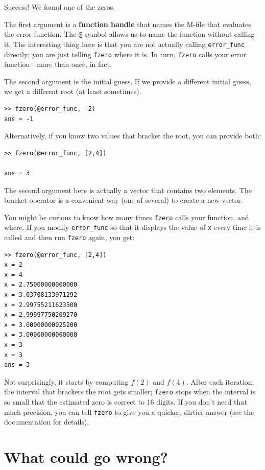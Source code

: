 \documentclass[
]{book}
\begin{document}
Success!  We found one of the zeros.

The first argument is a
{\bf function handle} that names the M-file that evaluates
the error function.  The {\tt @} symbol allows us to name the
function without calling it.  The interesting thing here is
that you are not actually calling {\tt error\_func} directly;
you are just telling {\tt fzero} where it is.  In turn, {\tt fzero}
calls your error function---more than once, in fact.

The second argument is the initial guess.  If we provide a different
initial guess, we get a different root (at least sometimes).

\begin{verbatim}
>> fzero(@error_func, -2)
ans = -1
\end{verbatim}

Alternatively, if you know two values that bracket the root,
you can provide both:

\begin{verbatim}
>> fzero(@error_func, [2,4])

ans = 3
\end{verbatim}

The second argument here is actually a vector that contains two
elements.  The bracket operator is a convenient way (one of several)
to create a new vector.

You might be curious to know how many times {\tt fzero} calls your
function, and where.  If you modify {\tt error\_func} so that it displays
the value of {\tt x} every time it is called and then run {\tt fzero}
again, you get:

\begin{verbatim}
>> fzero(@error_func, [2,4])
x = 2
x = 4
x = 2.75000000000000
x = 3.03708133971292
x = 2.99755211623500
x = 2.99997750209270
x = 3.00000000025200
x = 3.00000000000000
x = 3
x = 3
ans = 3
\end{verbatim}

Not surprisingly, it starts by computing $f(2)$ and $f(4)$.  After
each iteration, the interval that brackets the root gets smaller;
{\tt fzero} stops when the interval is so small that the estimated
zero is correct to 16 digits.  If you
don't need that much precision, you can tell {\tt fzero} to give
you a quicker, dirtier answer (see the documentation for details).


\section{What could go wrong?}
\end{document}
